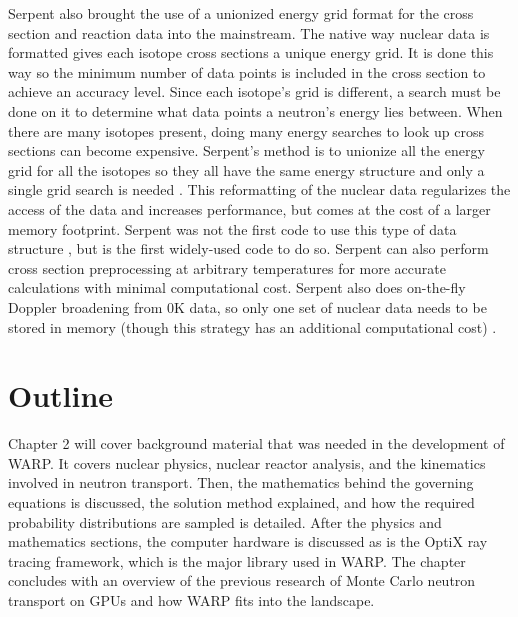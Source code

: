 Serpent also brought the use of a unionized energy grid format for the cross section and reaction data into the mainstream.  The native way nuclear data is formatted gives each isotope cross sections a unique energy grid.  It is done this way so the minimum number of data points is included in the cross section to achieve an accuracy level.  Since each isotope's grid is different, a search must be done on it to determine what data points a neutron's energy lies between.  When there are many isotopes present, doing many energy searches to look up cross sections can become expensive.  Serpent's method is to unionize all the energy grid for all the isotopes so they all have the same energy structure and only a single grid search is needed \cite{jaakko}. 
  This reformatting of the nuclear data regularizes the access of the data and increases performance, but comes at the cost of a larger memory footprint.  Serpent was not the first code to use this type of data structure \cite{vector}, but is the first widely-used code to do so.  Serpent can also perform cross section preprocessing at arbitrary temperatures for more accurate calculations with minimal computational cost. Serpent also does on-the-fly Doppler broadening from 0K data, so only one set of nuclear data needs to be stored in memory (though this strategy has an additional computational cost) \cite{serpent}.


\section{Outline}

Chapter 2 will cover background material that was needed in the development of WARP.  It covers nuclear physics, nuclear reactor analysis, and the kinematics involved in neutron transport.  Then, the mathematics behind the governing equations is discussed, the solution method explained, and how the required probability distributions are sampled is detailed.  After the physics and mathematics sections, the computer hardware is discussed as is the OptiX ray tracing framework, which is the major library used in WARP.  The chapter concludes with an overview of the previous research of Monte Carlo neutron transport on GPUs and how WARP fits into the landscape.

